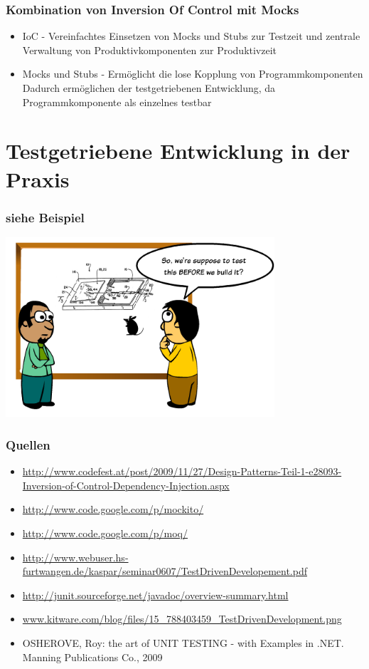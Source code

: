 \documentclass{beamer}
\begin{document}
\begin{frame}
\frametitle{Kombination von Inversion Of Control mit Mocks}
\begin{itemize}
\item IoC - Vereinfachtes Einsetzen von Mocks und Stubs zur Testzeit und zentrale Verwaltung von Produktivkomponenten zur Produktivzeit
\item Mocks und Stubs - Ermöglicht die lose Kopplung von Programmkomponenten\\
Dadurch ermöglichen der testgetriebenen Entwicklung, da Programmkomponente als einzelnes testbar\\
\end{itemize}
\end{frame}

\section{Testgetriebene Entwicklung in der Praxis}
\begin{frame}
\frametitle{siehe Beispiel}
\includegraphics[width=10cm]{TestDrivenDevelopment_155FE599.png}
\end{frame}

\begin{appendix}
\begin{frame}
\frametitle{Quellen}
\begin{itemize}
\item \url{http://www.codefest.at/post/2009/11/27/Design-Patterns-Teil-1-e28093-Inversion-of-Control-Dependency-Injection.aspx}
\item \url{http://www.code.google.com/p/mockito/}
\item \url{http://www.code.google.com/p/moq/}
\item \url{http://www.webuser.hs-furtwangen.de/kaspar/seminar0607/TestDrivenDevelopement.pdf}
\item \url{http://junit.sourceforge.net/javadoc/overview-summary.html}
\item \url{www.kitware.com/blog/files/15_788403459_TestDrivenDevelopment.png}
\item OSHEROVE, Roy: the art of UNIT TESTING - with Examples in .NET. Manning Publications Co., 2009
\end{itemize}
\end{frame}
\end{appendix}
\end{document}
